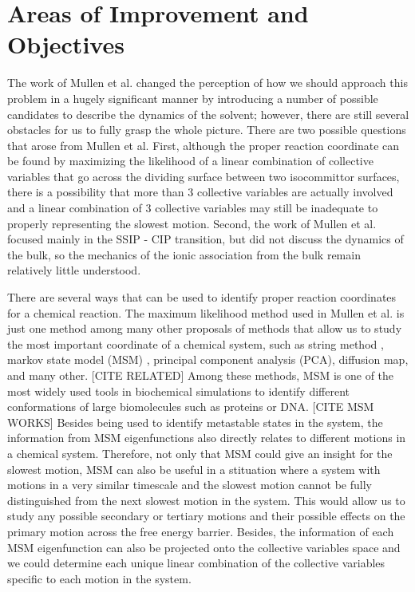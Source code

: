 \section{Areas of Improvement and Objectives}
\label{sec:L12L23}

\begin{spacing}{2.0}

    The work of Mullen et al. changed the perception of how we should approach this problem in a hugely significant manner by introducing a number 
    of possible candidates to describe the dynamics of the solvent; however, there are still several obstacles for us to fully grasp the whole 
    picture. There are two possible questions that arose from Mullen et al. First, although the proper reaction coordinate can be found by maximizing 
    the likelihood of a linear combination of collective variables that go across the dividing surface between two isocommittor surfaces, there is 
    a possibility that more than 3 collective variables are actually involved and a linear combination of 3 collective variables may still be 
    inadequate to properly representing the slowest motion. Second, the work of Mullen et al. focused mainly in the SSIP - CIP transition, but did 
    not discuss the dynamics of the bulk, so the mechanics of the ionic association from the bulk remain relatively little understood.

    There are several ways that can be used to identify proper reaction coordinates for a chemical reaction. The maximum likelihood method used in 
    Mullen et al. is just one method among many other proposals of methods that allow us to study the most important coordinate of a chemical system, 
    such as string method \cite{P-PhysRevB-2002-v66-E, P-JPhysChemB-2005-v109-E, P-JChemPhys-2007-v126-E}, markov state model (MSM)
    \cite{P-JChemPhys-2004-v121-Singhal, P-JChemPhys-2008-v129-Pan, P-Methods-2010-v52-Pande, P-PhysChemChemPhys-2011-v13-Prinz, P-JChemPhys-2011-v134-Prinz}, 
    principal component analysis (PCA), diffusion map, and many other. \cite{P-AnnuRevPhysChem-2013-v64-Rohrdanz} [CITE RELATED] Among these methods, 
    MSM is one of the most widely used tools in biochemical simulations to identify different conformations of large biomolecules such as proteins or DNA. 
    \cite{P-JCTC-2014-v10-Malmstrom} [CITE MSM WORKS] Besides being used to identify metastable states in the system, the information from MSM 
    eigenfunctions also directly relates to different motions in a chemical system. Therefore, not only that MSM could give an insight for the slowest 
    motion, MSM can also be useful in a stituation where a system with motions in a very similar timescale and the slowest motion cannot be fully 
    distinguished from the next slowest motion in the system. This would allow us to study any possible secondary or tertiary motions and their possible 
    effects on the primary motion across the free energy barrier. Besides, the information of each MSM eigenfunction can also be projected onto the 
    collective variables space and we could determine each unique linear combination of the collective variables specific to each motion in the system.
    \cite{P-JChemPhys-2013-v139-Perez-Hernandez, P-JChemPhys-2017-v146-Wu, P-CurrOpStructBiol-2017-v43-Noe}


\end{spacing}
